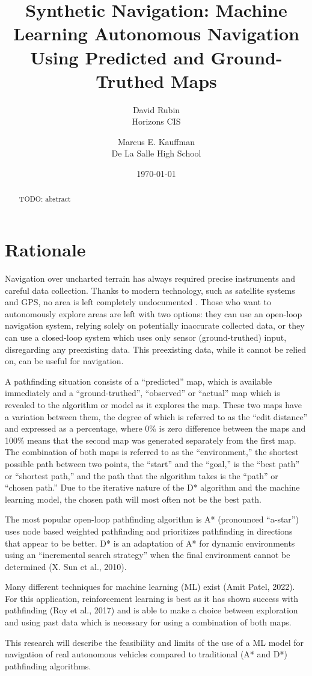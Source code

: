 \documentclass{article}
\title{Synthetic Navigation: Machine Learning Autonomous Navigation Using Predicted and Ground-Truthed Maps}
\author{
    David Rubin \\
    Horizons CIS \\
    \and
    Marcus E. Kauffman \\
    De La Salle High School \\
}
\date{\today}
\begin{document}
\maketitle

\begin{abstract}
    TODO: abstract
\end{abstract}

\section{Rationale}
    Navigation over uncharted terrain has always required precise instruments
and careful data collection. Thanks to modern technology, such as satellite 
systems and GPS, no area is left completely undocumented \citep{deschamps-berger2020, kervyn2007, li1988}. 
Those who want to autonomously explore areas are left with two options: 
they can use an open-loop navigation system, relying solely on potentially 
inaccurate collected data, or they can use a closed-loop system which uses 
only sensor (ground-truthed) input, disregarding any preexisting data. 
This preexisting data, while it cannot be relied on, can be useful for 
navigation. 

    A pathfinding situation consists of a “predicted” map, which is available 
immediately and a “ground-truthed”, “observed” or “actual” map which is 
revealed to the algorithm or model as it explores the map. These two maps 
have a variation between them, the degree of which is referred to as the 
“edit distance” and expressed as a percentage, where 0\% is zero difference 
between the maps and 100\% means that the second map was generated separately 
from the first map. The combination of both maps is referred to as the 
“environment,” the shortest possible path between two points, the “start” 
and the “goal,” is the “best path” or “shortest path,” and the path that 
the algorithm takes is the “path” or “chosen path.” Due to the iterative 
nature of the D* algorithm and the machine learning model, the chosen path 
will most often not be the best path. 

    The most popular open-loop pathfinding algorithm is A* (pronounced “a-star”) 
uses node based weighted pathfinding and prioritizes pathfinding in directions 
that appear to be better. D* is an adaptation of A* for dynamic environments 
using an “incremental search strategy” when the final environment cannot be 
determined (X. Sun et al., 2010). 

    Many different techniques for machine learning 
(ML) exist (Amit Patel, 2022). For this application, reinforcement learning 
is best as it has shown success with pathfinding (Roy et al., 2017) and is 
able to make a choice between exploration and using past data which is necessary 
for using a combination of both maps. 

    This research will describe the 
feasibility and limits of the use of a ML model for navigation of real 
autonomous vehicles compared to traditional (A* and D*) pathfinding algorithms.



\end{document}
